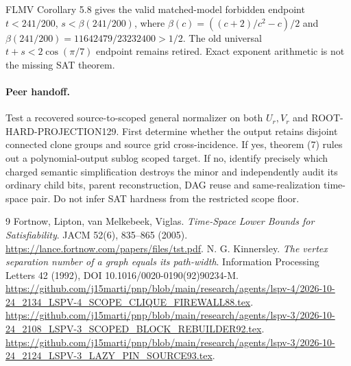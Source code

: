 \documentclass[11pt]{article}
\begin{document}
FLMV Corollary 5.8 gives the valid matched-model forbidden endpoint $t<241/200$, $s<\beta(241/200)$, where $\beta(c)=((c+2)/c^2-c)/2$ and $\beta(241/200)=11642479/23232400>1/2$. The old universal $t+s<2\cos(\pi/7)$ endpoint remains retired. Exact exponent arithmetic is not the missing SAT theorem.

\paragraph{Peer handoff.} Test a recovered source-to-scoped general normalizer on both $U_r,V_r$ and ROOT-HARD-PROJECTION129. First determine whether the output retains disjoint connected clone groups and source grid cross-incidence. If yes, theorem (7) rules out a polynomial-output sublog scoped target. If no, identify precisely which charged semantic simplification destroys the minor and independently audit its ordinary child bits, parent reconstruction, DAG reuse and same-realization time-space pair. Do not infer SAT hardness from the restricted scope floor.

\begin{thebibliography}{9}
 Fortnow, Lipton, van Melkebeek, Viglas. \emph{Time-Space Lower Bounds for Satisfiability}. JACM 52(6), 835--865 (2005). \url{https://lance.fortnow.com/papers/files/tst.pdf}.
 N. G. Kinnersley. \emph{The vertex separation number of a graph equals its path-width}. Information Processing Letters 42 (1992), DOI 10.1016/0020-0190(92)90234-M.
 \url{https://github.com/j15marti/pnp/blob/main/research/agents/lspv-4/2026-10-24_2134_LSPV-4_SCOPE_CLIQUE_FIREWALL88.tex}.
 \url{https://github.com/j15marti/pnp/blob/main/research/agents/lspv-3/2026-10-24_2108_LSPV-3_SCOPED_BLOCK_REBUILDER92.tex}.
 \url{https://github.com/j15marti/pnp/blob/main/research/agents/lspv-3/2026-10-24_2124_LSPV-3_LAZY_PIN_SOURCE93.tex}.
\end{thebibliography}
\end{document}
